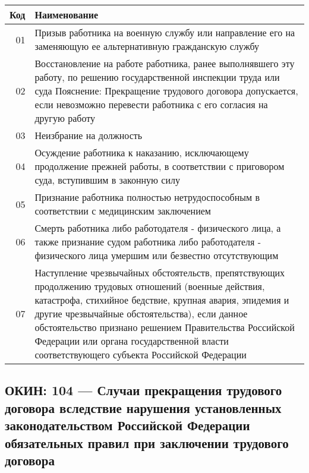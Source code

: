 \documentclass[10pt, a4paper, titlepage]{article}
\begin{document}
\begin{center}
    \begin{tabular}{rp{}}
        \hline
        \textbf{Код} & \textbf{Наименование} \\ \hline
        01 & Призыв работника на военную службу или направление его на заменяющую ее альтернативную гражданскую службу \\
        02 & Восстановление на  работе  работника,  ранее выполнявшего эту работу,  по решению государственной  инспекции  труда или суда Пояснение: Прекращение  трудового  договора  допускается, если  невозможно  перевести  работника  с его согласия на другую работу \\
        03 & Неизбрание на должность \\
        04 & Осуждение работника к наказанию, исключающему продолжение прежней   работы,   в  соответствии  с  приговором  суда, вступившим в законную силу \\
        05 & Признание работника    полностью    нетрудоспособным    в соответствии с медицинским заключением \\
        06 & Смерть работника либо работодателя - физического лица,  а также  признание  судом  работника  либо  работодателя  - физического лица умершим или безвестно отсутствующим \\
        07 & Наступление чрезвычайных   обстоятельств,  препятствующих продолжению   трудовых   отношений   (военные   действия, катастрофа,  стихийное бедствие, крупная авария, эпидемия и  другие  чрезвычайные  обстоятельства),   если   данное обстоятельство признано решением Правительства Российской Федерации    или    органа     государственной     власти соответствующего субъекта Российской Федерации \\
    \end{tabular}
\end{center}

\subsection{ОКИН: 104 --- Случаи прекращения трудового договора вследствие нарушения установленных законодательством Российской Федерации обязательных правил при заключении трудового договора}
\end{document}
